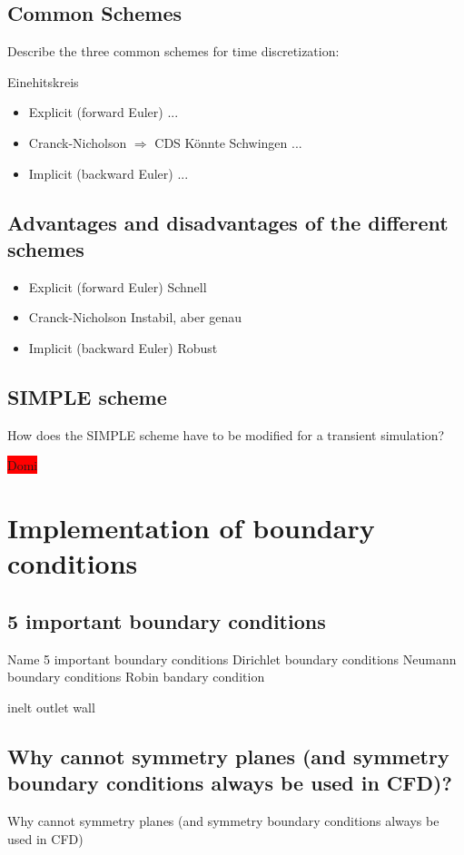 \documentclass[a4paper]{scrartcl}
\begin{document}
\subsection{Common Schemes} Describe the three common schemes for time
discretization:

Einehitskreis 
\begin{itemize}
\item Explicit (forward Euler)
...

\item Cranck-Nicholson $\Rightarrow$ CDS
Könnte Schwingen
...

\item Implicit (backward Euler)
...

\end{itemize}
\subsection{Advantages and disadvantages of the different schemes}
\begin{itemize}
\item Explicit (forward Euler)
Schnell

\item Cranck-Nicholson
Instabil, aber genau

\item Implicit (backward Euler)
Robust 
\end{itemize}
\subsection{SIMPLE scheme}
How does the SIMPLE scheme have to be modified for a transient
simulation?

\colorbox{red}{Domi}


\section{Implementation of boundary conditions}


\subsection{5 important boundary conditions}

 Name 5 important boundary
conditions Dirichlet boundary conditions
Neumann boundary conditions
Robin bandary  condition


inelt
outlet
wall



\subsection{Why cannot symmetry planes (and symmetry boundary conditions always
be used in CFD)?}
Why cannot symmetry planes (and symmetry boundary conditions always
be used in CFD)
\end{document}
